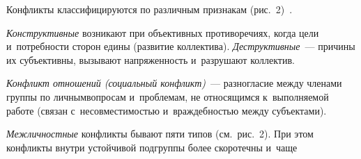 \begin{multicols}{2}
  Конфликты классифицируются по различным признакам  
(рис.~2)~\cite{8-r, 10-r}. 
  
  \textit{Конструктивные} возникают при объективных противоречиях, когда 
цели и~потребности сторон едины (развитие коллектива). 
\textit{Деструктивные}~--- причины их субъективны, вызывают напряженность и~разрушают коллектив.
  
  \textit{Конфликт отношений (социальный конфликт)}~--- разногласие между 
членами группы по личным\linebreak вопросам и~проблемам, не относящимся 
к~вы\-пол\-ня\-емой работе (связан с~несовместимостью и~враждебностью между 
субъектами). 



  \textit{Межличностные} конфликты бывают пяти типов (см.\ рис.~2). При этом 
конфликты внутри устойчивой подгруппы более скоротечны и~чаще\linebreak\vspace*{-12pt}

\pagebreak

\end{multicols}

\begin{figure*} %
 \vspace*{1pt}
    \begin{center}  
  \mbox{%
 \epsfxsize=134.001mm 
 }
\end{center}
\vspace*{-9pt}
\vspace*{24pt}
    \begin{center}  
  \mbox{%
 \epsfxsize=157.144mm 
 }
\end{center}
\vspace*{-9pt}
\end{figure*}

